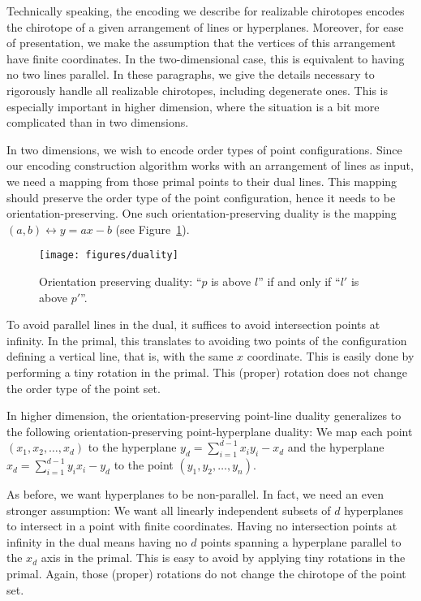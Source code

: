 
Technically speaking, the encoding we describe for realizable chirotopes
encodes the chirotope of a given arrangement of lines or hyperplanes.
Moreover, for ease of presentation, we make the assumption that the vertices of
this arrangement have finite coordinates. In the two-dimensional case, this
is equivalent to having no two lines parallel. In these paragraphs, we give the
details necessary to rigorously handle all realizable chirotopes, including
degenerate ones. This is especially important in higher dimension, where the
situation is a bit more complicated than in two dimensions.

In two dimensions, we wish to encode order types of point configurations.
Since our encoding construction algorithm works with an arrangement of lines as
input, we need a mapping from those primal points to their dual lines. This
mapping should preserve the order type of the point configuration, hence it
needs to be orientation-preserving. One such orientation-preserving duality is
the mapping \((a,b) \leftrightarrow y = ax - b\) (see Figure~\ref{fig:duality}).

\begin{figure}
  \centering{}
  \texttt{[image: figures/duality]}
  \caption{Orientation preserving duality: ``\(p\) is above \(l\)'' if and only if
  ``\(l'\) is above \(p'\)''.}\label{fig:duality}
\end{figure}

To avoid parallel lines in the dual, it suffices to avoid intersection points
at infinity. In the primal, this translates to avoiding two points of the
configuration defining a vertical line, that is, with the same \(x\) coordinate.
This is easily done by performing a tiny rotation in the primal.
This (proper) rotation does not change the order type of the point set.

In higher dimension, the orientation-preserving point-line duality generalizes
to the following orientation-preserving point-hyperplane duality: We map each
point \((x_1, x_2, \ldots, x_d)\) to the hyperplane \(y_d = \sum_{i=1}^{d-1}
x_i y_i - x_d \) and the hyperplane \(x_d = \sum_{i=1}^{d-1} y_i x_i - y_d \)
to the point \(( y_1, y_2, \ldots, y_n)\).

As before, we want hyperplanes to be non-parallel. In fact, we need an even
stronger assumption: We want all linearly independent subsets of \(d\)
hyperplanes to intersect in a point with finite coordinates.
%
Having no intersection points at infinity in the dual
means having no \(d\) points spanning a hyperplane parallel to the
\(x_d\) axis in the primal. This is easy to avoid by applying tiny rotations
in the primal. Again, those (proper) rotations do not change the chirotope of the
point set.

